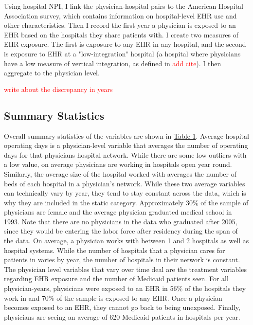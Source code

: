 \documentclass[11pt]{article}
\begin{document}
Using hospital NPI, I link the physician-hospital pairs to the American Hospital Association survey, which contains information on hospital-level EHR use and other characteristics. Then I record the first year a physician is exposed to an EHR based on the hospitals they share patients with. I create two measures of EHR exposure. The first is exposure to any EHR in any hospital, and the second is exposure to EHR at a "low-integration" hospital (a hospital where physicians have a low measure of vertical integration, as defined in \textcolor{red}{add cite}). I then aggregate to the physician level. 

\textcolor{red}{write about the discrepancy in years}

\subsection{Summary Statistics}

Overall summary statistics of the variables are shown in \hyperref[fig:summarystatistics]{Table 1}. Average hospital operating days is a physician-level variable that averages the number of operating days for that physicians hospital network. While there are some low outliers with a low value, on average physicians are working in hospitals open year round. Similarly, the average size of the hospital worked with averages the number of beds of each hospital in a physician's network. While these two average variables can technically vary by year, they tend to stay constant across the data, which is why they are included in the static category. Approximately 30\% of the sample of physicians are female and the average physician graduated medical school in 1993. Note that there are no physicians in the data who graduated after 2005, since they would be entering the labor force after residency during the span of the data. On average, a physician works with between 1 and 2 hospitals as well as hospital systems. While the number of hospitals that a physician cares for patients in varies by year, the number of hospitals in their network is constant. The physician level variables that vary over time deal are the treatment variables regarding EHR exposure and the number of Medicaid patients seen. For all physician-years, physicians were exposed to an EHR in 56\% of the hospitals they work in and 70\% of the sample is exposed to any EHR. Once a physician becomes exposed to an EHR, they cannot go back to being unexposed. Finally, physicians are seeing an average of 620 Medicaid patients in hospitals per year.
\end{document}
